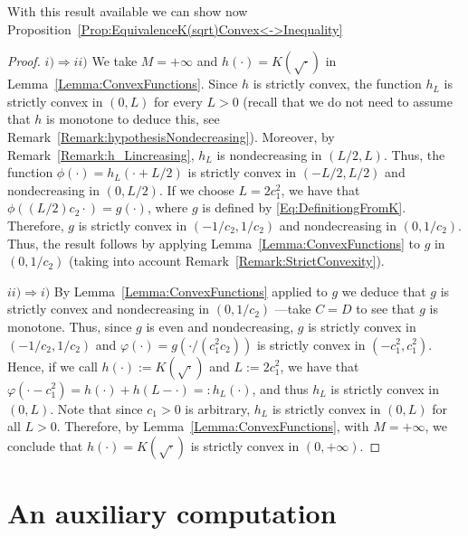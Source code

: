\documentclass[12pt,reqno]{amsart}
\theoremstyle{definition}
\theoremstyle{remark}
\numberwithin{equation}{section}
\begin{document}
With this result available we can show now Proposition~\ref{Prop:EquivalenceK(sqrt)Convex<->Inequality}

\begin{proof}
	$i) \Rightarrow ii)$ We take $M = +\infty$ and $h(\cdot) = K(\sqrt{\cdot})$ in Lemma~\ref{Lemma:ConvexFunctions}. Since $h$ is strictly convex, the function $h_L$ is strictly convex in $(0,L)$ for every $L> 0$ (recall that we do not need to assume that $h$ is monotone to deduce this, see Remark~\ref{Remark:hypothesisNondecreasing}). Moreover, by Remark~\ref{Remark:h_Lincreasing}, $h_L$ is nondecreasing in $(L/2,L)$. Thus, the function $\phi(\cdot) = h_L(\cdot + L/2)$ is strictly convex in $(-L/2,L/2)$ and nondecreasing in $(0,L/2)$. If we choose $L=2c_1^2$, we have that $\phi((L/2)c_2 \cdot) = g(\cdot)$, where $g$ is defined by \eqref{Eq:DefinitiongFromK}. Therefore, $g$ is strictly convex in $(-1/c_2, 1/c_2)$ and nondecreasing in $(0,1/c_2)$. Thus, the result follows by applying  Lemma~\ref{Lemma:ConvexFunctions} to $g$ in $(0,1/c_2)$ (taking into account Remark~\ref{Remark:StrictConvexity}).
	
	
	$ii) \Rightarrow i)$ By Lemma~\ref{Lemma:ConvexFunctions} applied to $g$ we deduce that $g$ is strictly convex and nondecreasing in $(0,1/c_2)$ ---take $C=D$ to see that $g$ is monotone. Thus, since $g$ is even and nondecreasing, $g$ is strictly convex in $(-1/c_2,1/c_2)$ and $\varphi(\cdot) = g(\cdot/(c_1^2 c_2))$ is strictly convex in $(-c_1^2, c_1^2)$. Hence, if we call $h(\cdot) := K(\sqrt{\cdot})$ and $L:= 2c_1^2$, we have that $\varphi(\cdot - c_1^2) = h(\cdot) + h(L-\cdot) =:  h_L(\cdot)$, and thus $h_L$ is strictly convex in $(0,L)$. Note that since $c_1>0$ is arbitrary, $h_L$ is strictly convex in $(0,L)$ for all $L>0$. Therefore, by Lemma~\ref{Lemma:ConvexFunctions}, with  $M = +\infty$, we conclude that $h(\cdot) = K(\sqrt{\cdot})$ is strictly convex in $(0,+\infty)$.
\end{proof}


\section{An auxiliary computation}
\label{Sec:AuxiliaryResults2}
\end{document}
